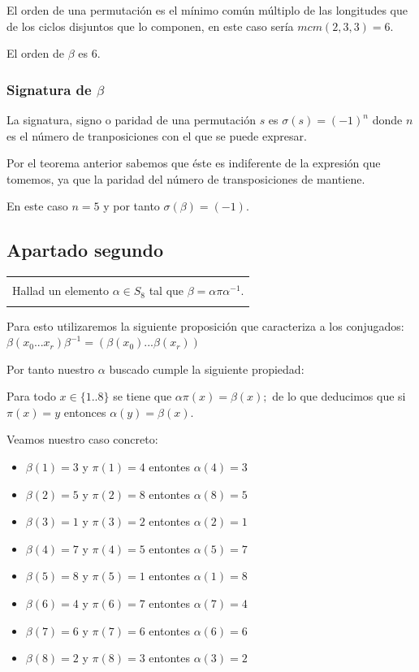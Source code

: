 \documentclass[12pt]{article}
\newenvironment{micaja}
{
    \begin{center}
    \begin{tabular}{|p{0.9\textwidth}|}
    \hline\\
    }   
    {   
    \\\\\hline
    \end{tabular} 
    \end{center}
    }
\begin{document}
El orden de una permutación es el mínimo común múltiplo de las longitudes que de los ciclos disjuntos que lo componen, en este caso sería $mcm(2,3,3)=6.$

El orden de $\beta$ es 6.

\subsubsection*{Signatura de $\beta$}

La signatura, signo o paridad de una permutación $s$ es $\sigma(s) = (-1)^n$ donde $n$ es el número de tranposiciones con el que se puede expresar.

Por el teorema anterior sabemos que éste es indiferente de la expresión  que tomemos, ya que la paridad del número de transposiciones de mantiene.

En este caso $n=5$ y por tanto $\sigma(\beta) = (-1).$

\subsection{Apartado segundo}
\begin{micaja}
Hallad un elemento $\alpha  \in S_8$ tal que $\beta = \alpha \pi \alpha^{-1}.$
\end{micaja}
Para esto utilizaremos la siguiente proposición que caracteriza a los conjugados: $\beta (x_0 ... x_r) \beta^{-1} = ( \beta (x_0)... \beta(x_r))$

Por tanto nuestro $\alpha$ buscado cumple la siguiente propiedad:

Para todo $x \in \{1..8\}$ se tiene que $\alpha \pi (x) = \beta(x);$ de lo que deducimos que si $\pi(x)=y$ entonces $\alpha(y) = \beta(x).$

Veamos nuestro caso concreto:
\begin{itemize}
\item $\beta(1) = 3$ y $\pi(1)=4$ entontes $\alpha(4)=3$
\item $\beta(2) = 5$ y $\pi(2)=8$ entontes $\alpha(8)=5$
\item $\beta(3) = 1$ y $\pi(3)=2$ entontes $\alpha(2)=1$
\item $\beta(4) = 7$ y $\pi(4)=5$ entontes $\alpha(5)=7$
\item $\beta(5) = 8$ y $\pi(5)=1$ entontes $\alpha(1)=8$
\item $\beta(6) = 4$ y $\pi(6)=7$ entontes $\alpha(7)=4$
\item $\beta(7) = 6$ y $\pi(7)=6$ entontes $\alpha(6)=6$
\item $\beta(8) = 2$ y $\pi(8)=3$ entontes $\alpha(3)=2$
\end{itemize}
\end{document}

